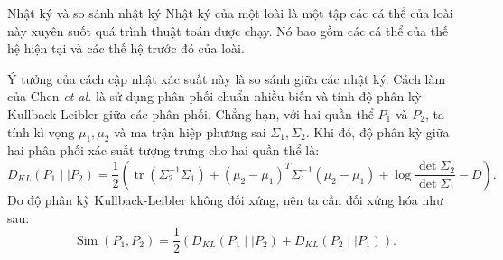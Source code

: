 \begin{frame}{Nhật ký và so sánh nhật ký}
Nhật ký của một loài là một tập các cá thể của loài này xuyên suốt quá trình
thuật toán được chạy. Nó bao gồm các cá thể của thế hệ hiện tại và các thế hệ
trước đó của loài.

Ý tưởng của cách cập nhật xác suất này là so sánh giữa các nhật ký. Cách làm của
Chen \textit{et al.} là sử dụng phân phối chuẩn nhiều biến và tính độ phân kỳ
Kullback-Leibler giữa các phân phối. Chẳng hạn, với hai quần thể \( P_{1} \) và
\( P_{2} \), ta tính kì vọng \( \mu_{1}, \mu_{2} \) và ma trận hiệp phương sai
\( \Sigma_{1}, \Sigma_{2} \). Khi đó, độ phân kỳ giữa hai phân phối xác suất
tượng trưng cho hai quần thể là:
\[
  D_{KL}(P_{1}\mid \mid P_{2}) = \frac{1}{2} \left(
  \operatorname{tr}(\Sigma_{2}^{-1}\Sigma_{1}) +
(\mu_{2}-\mu_{1})^{T}\Sigma_{1}^{-1}(\mu_{2}-\mu_{1}) + \log
\frac{\operatorname{det} \Sigma_{2}}{\operatorname{det} \Sigma_{1}} - D \right) 
.\] 
Do độ phân kỳ Kullback-Leibler không đối xứng, nên ta cần đối xứng hóa như sau:
\[
  \operatorname{Sim}(P_{1}, P_{2}) = \frac{1}{2} \left( D_{KL}(P_{1}\mid \mid
  P_{2}) + D_{KL}(P_{2}\mid \mid P_{1}) \right) 
.\] 
\end{frame}

